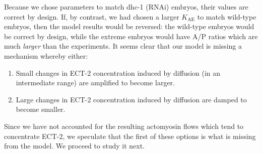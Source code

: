 \documentclass[11pt]{article}
\begin{document}
Because we chose parameters to match dhc-1 (RNAi) embryos, their values are correct by design. If, by contrast, we had chosen a larger $K_\text{AE}$ to match wild-type embryos, then the model results would be reversed: the wild-type embryos would be correct by design, while the extreme embryos would have A/P ratios which are much \emph{larger} than the experiments. 
It seems clear that our model is missing a mechanism whereby either:
\begin{enumerate}
\item Small changes in ECT-2 concentration induced by diffusion (in an intermediate range) are amplified to become larger.
\item Large changes in ECT-2 concentration induced by diffusion are damped to become smaller.
\end{enumerate}
Since we have not accounted for the resulting actomyosin flows which tend to concentrate ECT-2, we speculate that the first of these options is what is missing from the model. We proceed to study it next.
\end{document}

